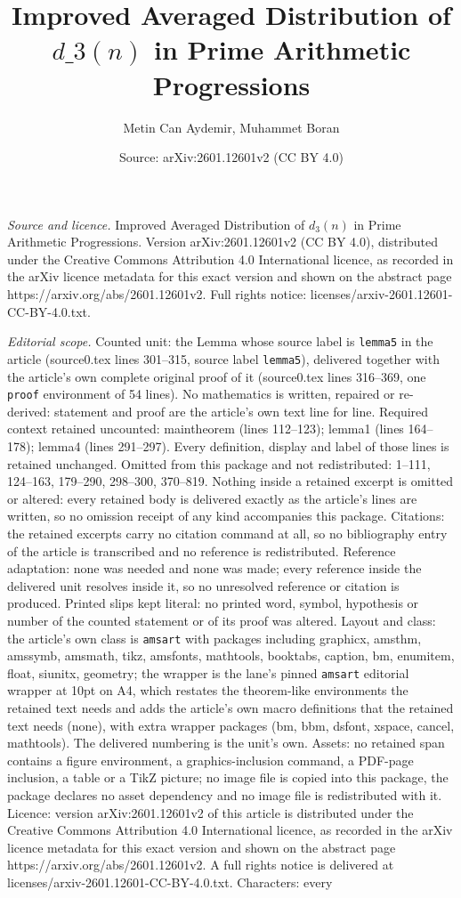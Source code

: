 \documentclass[10pt,a4paper]{amsart}
\title[Improved Averaged Distribution of $d\_3(n)$ in Prime Arithmet]{Improved Averaged Distribution of $d\_3(n)$ in Prime Arithmetic Progressions}
\author{Metin Can Aydemir, Muhammet Boran}
\date{Source: arXiv:2601.12601v2 (CC BY 4.0)}
\begin{document}
\maketitle

\noindent\emph{Source and licence.} Improved Averaged Distribution of $d_3(n)$ in Prime Arithmetic Progressions. Version arXiv:2601.12601v2 (CC BY 4.0), distributed under the Creative Commons Attribution 4.0 International licence, as recorded in the arXiv licence metadata for this exact version and shown on the abstract page https://arxiv.org/abs/2601.12601v2. Full rights notice: licenses/arxiv-2601.12601-CC-BY-4.0.txt.\par\smallskip

\noindent\textit{Editorial scope.} Counted unit: the Lemma whose source label is \texttt{lemma5} in the article (source0.tex lines 301--315, source label \texttt{lemma5}), delivered together with the article's own complete original proof of it (source0.tex lines 316--369, one \texttt{proof} environment of 54 lines). No mathematics is written, repaired or re-derived: statement and proof are the article's own text line for line. Required context retained uncounted: maintheorem (lines 112--123); lemma1 (lines 164--178); lemma4 (lines 291--297). Every definition, display and label of those lines is retained unchanged. Omitted from this package and not redistributed: 1--111, 124--163, 179--290, 298--300, 370--819. Nothing inside a retained excerpt is omitted or altered: every retained body is delivered exactly as the article's lines are written, so no omission receipt of any kind accompanies this package. Citations: the retained excerpts carry no citation command at all, so no bibliography entry of the article is transcribed and no reference is redistributed. Reference adaptation: none was needed and none was made; every reference inside the delivered unit resolves inside it, so no unresolved reference or citation is produced. Printed slips kept literal: no printed word, symbol, hypothesis or number of the counted statement or of its proof was altered. Layout and class: the article's own class is \texttt{amsart} with packages including graphicx, amsthm, amssymb, amsmath, tikz, amsfonts, mathtools, booktabs, caption, bm, enumitem, float, siunitx, geometry; the wrapper is the lane's pinned \texttt{amsart} editorial wrapper at 10pt on A4, which restates the theorem-like environments the retained text needs and adds the article's own macro definitions that the retained text needs (none), with extra wrapper packages (bm, bbm, dsfont, xspace, cancel, mathtools). The delivered numbering is the unit's own. Assets: no retained span contains a figure environment, a graphics-inclusion command, a PDF-page inclusion, a table or a TikZ picture; no image file is copied into this package, the package declares no asset dependency and no image file is redistributed with it. Licence: version arXiv:2601.12601v2 of this article is distributed under the Creative Commons Attribution 4.0 International licence, as recorded in the arXiv licence metadata for this exact version and shown on the abstract page https://arxiv.org/abs/2601.12601v2. A full rights notice is delivered at licenses/arxiv-2601.12601-CC-BY-4.0.txt. Characters: every 
\end{document}
